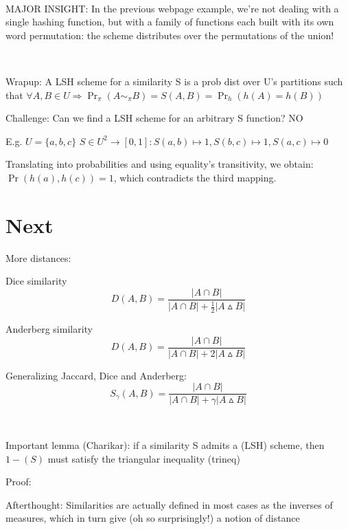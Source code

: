 \documentclass{report}
\begin{document}
	\
	
	MAJOR INSIGHT: In the previous webpage example, we're not dealing with a single hashing function, but with a family of functions each built with its own word permutation: the scheme distributes over the permutations of the union!
	
	\
	
	Wrapup: A LSH scheme for a similarity S is a prob dist over U's partitions such that $\forall A, B \in  U \Rightarrow \Pr_\pi(A\sim_\pi B) = S(A, B) = \Pr_h(h(A)=h(B))$
	
	Challenge: Can we find a LSH scheme for an arbitrary S function? NO
	
	E.g. $U = \{a, b, c\}$
	$S \in U^2 \rightarrow [0, 1] : S(a, b) \mapsto 1, S(b, c) \mapsto 1, S(a, c) \mapsto 0$ %
	
	Translating into probabilities and using equality's transitivity, we obtain: $\Pr(h(a), h(c))=1$, which contradicts the third mapping.
	
	 
	
	
	\chapter{Next}
	
	More distances:
	
	Dice similarity
	\begin{equation}
	\displaystyle D(A, B) = \frac{|A\cap B|}{|A\cap B| + \frac{1}{2}|A\vartriangle B|}
	\end{equation}
	
	Anderberg similarity
	\begin{equation}
	\displaystyle D(A, B) = \frac{|A\cap B|}{|A\cap B| + 2|A\vartriangle B|}
	\end{equation}
	
	Generalizing Jaccard, Dice and Anderberg: 
	\begin{equation}
	\displaystyle S_\gamma(A, B) = \frac{|A\cap B|}{|A\cap B| + \gamma|A\vartriangle B|}
	\end{equation}
	
	\
	
	Important lemma (Charikar): if a similarity S admits a (LSH) scheme, then $1-(S)$ must satisfy the triangular inequality (trineq)
	
	Proof: %
	
	Afterthought: Similarities are actually defined in most cases as the inverses of measures, which in turn give (oh so surprisingly!) a notion of distance
	\
	
\end{document}
